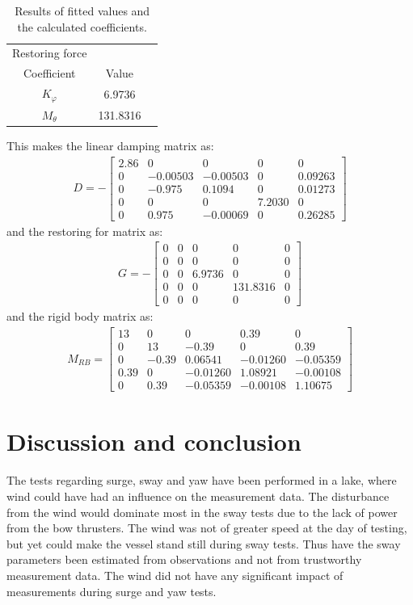 \begin{table}[htbp]
\centering
\begin{tabular}{ccc}
	\toprule
  Restoring force\\Coefficient & Value \\
  \midrule
  $K_\varphi$ & 6.9736 \\
  $M_\theta$ & 131.8316 \\
  	\bottomrule
\end{tabular}
\caption{Results of fitted values and the calculated coefficients.}
\label{tab:gmatrix}
\end{table}

This makes the linear damping matrix as:
\begin{align}
D = -
\begin{bmatrix}
2.86 & 0 & 0 & 0 & 0\\
0 & -0.00503 & -0.00503 & 0 & 0.09263\\
0 & -0.975 & 0.1094 & 0 & 0.01273\\
0 & 0 & 0 & 7.2030 & 0\\
0 & 0.975 & -0.00069 & 0 & 0.26285
\end{bmatrix}
\end{align}
and the restoring for matrix as:
\begin{align}
G = -
\begin{bmatrix}
0 & 0 & 0 & 0 & 0\\
0 & 0 & 0 & 0 & 0\\
0 & 0 & 6.9736 & 0 & 0\\
0 & 0 & 0 & 131.8316 & 0\\
0 & 0 & 0 & 0 & 0
\end{bmatrix}
\end{align}
and the rigid body matrix as:
\begin{align}
M_{RB} =
\begin{bmatrix}
13 & 0 & 0 & 0.39 & 0\\
0 & 13 & -0.39 & 0 & 0.39\\
0 & -0.39 & 0.06541 & -0.01260 & -0.05359\\
0.39 & 0 & -0.01260 & 1.08921 & -0.00108\\
0 & 0.39 & -0.05359 & -0.00108 & 1.10675
\end{bmatrix}
\end{align}
\section{Discussion and conclusion}
The tests regarding surge, sway and yaw have been performed in a lake, where wind could have had an influence on the measurement data. The disturbance from the wind would dominate most in the sway tests due to the lack of power from the bow thrusters. The wind was not of greater speed at the day of testing, but yet could make the vessel stand still during sway tests. Thus have the sway parameters been estimated from observations and not from trustworthy measurement data. The wind did not have any significant impact of measurements during surge and yaw tests.

